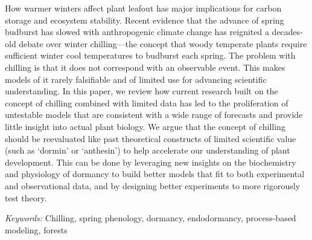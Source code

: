 \documentclass[11pt]{article}
\providecommand{\DIFaddbegin}{} %
\providecommand{\DIFaddend}{} %
\providecommand{\DIFdelbegin}{} %
\providecommand{\DIFdelend}{} %
\newcommand{\DIFscaledelfig}{0.5}
\newlength{\DIFdelgraphicswidth} %
\newlength{\DIFdelgraphicsheight} %
\newcommand{\DIFaddincludegraphics}[2][]{{\color{blue}\fbox{\DIFOincludegraphics[#1]{#2}}}} %
\newcommand{\DIFdelincludegraphics}[2][]{%
\sbox{\DIFdelgraphicsbox}{\DIFOincludegraphics[#1]{#2}}%
\settoboxwidth{\DIFdelgraphicswidth}{\DIFdelgraphicsbox} %
\settoboxtotalheight{\DIFdelgraphicsheight}{\DIFdelgraphicsbox} %
\scalebox{\DIFscaledelfig}{%
\parbox[b]{\DIFdelgraphicswidth}{\usebox{\DIFdelgraphicsbox}\\[-\baselineskip] \rule{\DIFdelgraphicswidth}{0em}}\llap{\resizebox{\DIFdelgraphicswidth}{\DIFdelgraphicsheight}{%
\setlength{\unitlength}{\DIFdelgraphicswidth}%
\begin{picture}(1,1)%
\thicklines\linethickness{2pt} %
{\color[rgb]{1,0,0}\put(0,0){\framebox(1,1){}}}%
{\color[rgb]{1,0,0}\put(0,0){\line( 1,1){1}}}%
{\color[rgb]{1,0,0}\put(0,1){\line(1,-1){1}}}%
\end{picture}%
}\hspace*{3pt}}} %
} %
\DeclareRobustCommand{\DIFaddbegin}{\DIFOaddbegin \let\includegraphics\DIFaddincludegraphics} %
\DeclareRobustCommand{\DIFaddend}{\DIFOaddend \let\includegraphics\DIFOincludegraphics} %
\DeclareRobustCommand{\DIFdelbegin}{\DIFOdelbegin \let\includegraphics\DIFdelincludegraphics} %
\DeclareRobustCommand{\DIFdelend}{\DIFOaddend \let\includegraphics\DIFOincludegraphics} %
\begin{document}
\DIFaddend %
How warmer winters affect plant leafout has major implications for carbon storage and ecosystem stability. Recent evidence that the advance of spring budburst has slowed with anthropogenic climate change has reignited a decades-old debate over winter chilling---the concept that woody temperate plants require sufficient winter cool temperatures to budburst each spring. The problem with chilling is that it does not correspond with an observable event.  This makes models of it rarely falsifiable and of limited use for advancing scientific understanding. In this paper, we review how current research built on the concept of chilling combined with limited data has led to the proliferation of untestable models that are consistent with a wide range of forecasts and provide little insight into actual plant biology. We argue that the concept of chilling should be reevaluated like past theoretical constructs of limited scientific value (such as `dormin' or  `anthesin') to help accelerate our understanding of plant development. This can be done by leveraging new insights on the biochemistry and physiology of dormancy to build better models that fit to both experimental and observational data, and by designing better experiments to more rigorously test theory. %
\DIFdelbegin %
\DIFdelend \DIFaddbegin 

\DIFaddend %

\emph{Keywords:} Chilling, spring phenology, dormancy, endodormancy, process-based modeling, forests
\end{document}
